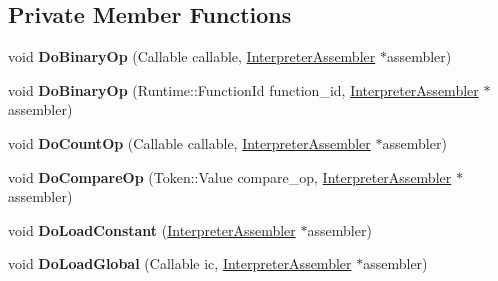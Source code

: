 \subsection*{Private Member Functions}
\begin{DoxyCompactItemize}
\item 
void {\bfseries Do\+Binary\+Op} (Callable callable, \hyperlink{classv8_1_1internal_1_1interpreter_1_1_interpreter_assembler}{Interpreter\+Assembler} $\ast$assembler)\hypertarget{classv8_1_1internal_1_1interpreter_1_1_interpreter_a591697e1d2b70c2f9f78b469d3e27742}{}\label{classv8_1_1internal_1_1interpreter_1_1_interpreter_a591697e1d2b70c2f9f78b469d3e27742}

\item 
void {\bfseries Do\+Binary\+Op} (Runtime\+::\+Function\+Id function\+\_\+id, \hyperlink{classv8_1_1internal_1_1interpreter_1_1_interpreter_assembler}{Interpreter\+Assembler} $\ast$assembler)\hypertarget{classv8_1_1internal_1_1interpreter_1_1_interpreter_a4b708b49f383daa5d53e227d0d24d476}{}\label{classv8_1_1internal_1_1interpreter_1_1_interpreter_a4b708b49f383daa5d53e227d0d24d476}

\item 
void {\bfseries Do\+Count\+Op} (Callable callable, \hyperlink{classv8_1_1internal_1_1interpreter_1_1_interpreter_assembler}{Interpreter\+Assembler} $\ast$assembler)\hypertarget{classv8_1_1internal_1_1interpreter_1_1_interpreter_a9e0d9a2a58123eace4a32b41f0ec77bd}{}\label{classv8_1_1internal_1_1interpreter_1_1_interpreter_a9e0d9a2a58123eace4a32b41f0ec77bd}

\item 
void {\bfseries Do\+Compare\+Op} (Token\+::\+Value compare\+\_\+op, \hyperlink{classv8_1_1internal_1_1interpreter_1_1_interpreter_assembler}{Interpreter\+Assembler} $\ast$assembler)\hypertarget{classv8_1_1internal_1_1interpreter_1_1_interpreter_ab516863447c2afb681ca4913b6a3a6e6}{}\label{classv8_1_1internal_1_1interpreter_1_1_interpreter_ab516863447c2afb681ca4913b6a3a6e6}

\item 
void {\bfseries Do\+Load\+Constant} (\hyperlink{classv8_1_1internal_1_1interpreter_1_1_interpreter_assembler}{Interpreter\+Assembler} $\ast$assembler)\hypertarget{classv8_1_1internal_1_1interpreter_1_1_interpreter_a021fbade24c205e3ee32348131ea8c3c}{}\label{classv8_1_1internal_1_1interpreter_1_1_interpreter_a021fbade24c205e3ee32348131ea8c3c}

\item 
void {\bfseries Do\+Load\+Global} (Callable ic, \hyperlink{classv8_1_1internal_1_1interpreter_1_1_interpreter_assembler}{Interpreter\+Assembler} $\ast$assembler)\hypertarget{classv8_1_1internal_1_1interpreter_1_1_interpreter_af64fa4c151f64fddf6d924241cbacec9}{}\label{classv8_1_1internal_1_1interpreter_1_1_interpreter_af64fa4c151f64fddf6d924241cbacec9}


\end{DoxyCompactItemize}
